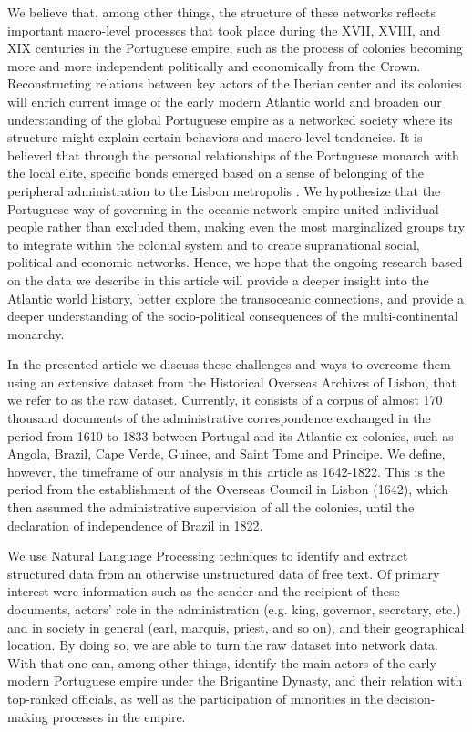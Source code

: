 \documentclass{article}
\begin{document}
We believe that, among other things, the structure of these networks reflects important macro-level processes that took place during the XVII, XVIII, and XIX centuries in the Portuguese empire, such as the process of colonies becoming more and more independent politically and economically from the Crown. Reconstructing relations between key actors of the Iberian center and its colonies will enrich current image of the early modern Atlantic world and broaden our understanding of the global Portuguese empire as a networked society where its structure might explain certain behaviors and macro-level tendencies. It is believed that through the personal relationships of the Portuguese monarch with the local elite, specific bonds emerged based on a sense of belonging of the peripheral administration to the Lisbon metropolis \cite{xavier_o_2016}. We hypothesize that the Portuguese way of governing in the oceanic network empire united  individual people rather than excluded them, making even the most marginalized groups try to integrate within the colonial system and to create supranational social, political and economic networks. Hence, we hope that the ongoing research based on the data we describe in this article will provide a deeper insight into the Atlantic world history, better explore the transoceanic connections, and provide a deeper understanding of the socio-political consequences of the multi-continental monarchy. 

In the presented article we discuss these challenges and ways to overcome them using an extensive dataset from the Historical Overseas Archives of Lisbon, that we refer to as the raw dataset. Currently, it consists of a corpus of almost 170 thousand documents of the administrative correspondence exchanged in the period from 1610 to 1833 between  Portugal and its Atlantic ex-colonies, such as Angola, Brazil, Cape Verde, Guinee, and Saint Tome and Principe. We define, however, the timeframe of our analysis in this article as 1642-1822. This is the period from the establishment of the Overseas Council in Lisbon (1642), which then assumed the administrative supervision of all the colonies, until the declaration of independence of Brazil in 1822.

We use Natural Language Processing techniques to identify and extract structured data from an otherwise unstructured data of free text. Of primary interest were information such as the sender and the recipient of these documents, actors' role in the administration (e.g. king, governor, secretary, etc.) and in society in general (earl, marquis, priest, and so on), and their geographical location. By doing so, we are able to turn the raw dataset into network data. With that one can, among other things, identify the main actors of the early modern Portuguese empire under the Brigantine Dynasty, and their relation with top-ranked officials, as well as the participation of minorities in the decision-making processes in the empire.
\end{document}
